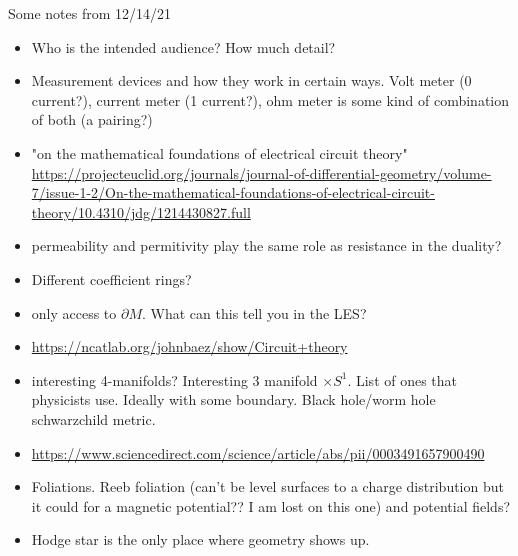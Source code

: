 \documentclass{article}
\begin{document}
Some notes from 12/14/21
\begin{itemize}
    \item Who is the intended audience? How much detail? 
    \item Measurement devices and how they work in certain ways. Volt meter (0 current?), current meter (1 current?), ohm meter is some kind of combination of both (a pairing?)
    \item "on the mathematical foundations of electrical circuit theory"  \url{https://projecteuclid.org/journals/journal-of-differential-geometry/volume-7/issue-1-2/On-the-mathematical-foundations-of-electrical-circuit-theory/10.4310/jdg/1214430827.full}
    \item permeability and permitivity play the same role as resistance in the duality?
    \item Different coefficient rings?
    \item only access to $\partial M$. What can this tell you in the LES?
    \item \url{https://ncatlab.org/johnbaez/show/Circuit+theory}
    \item interesting 4-manifolds? Interesting 3 manifold $\times S^1$. List of ones that physicists use. Ideally with some boundary. Black hole/worm hole schwarzchild metric.
    \item \url{https://www.sciencedirect.com/science/article/abs/pii/0003491657900490}
    \item Foliations. Reeb foliation (can't be level surfaces to a charge distribution but it could for a magnetic potential?? I am lost on this one) and potential fields?
    \item Hodge star is the only place where geometry shows up.
\end{itemize}

\end{document}
